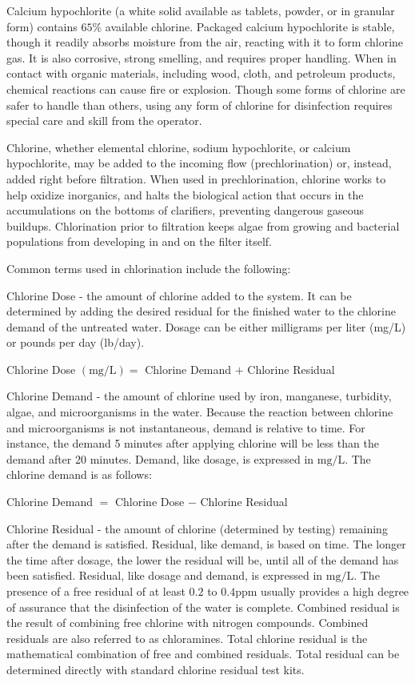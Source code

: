\documentclass[10pt]{article}
\begin{document}
Calcium hypochlorite (a white solid available as tablets, powder, or in granular form) contains $65 \%$ available chlorine. Packaged calcium hypochlorite is stable, though it readily absorbs moisture from the air, reacting with it to form chlorine gas. It is also corrosive, strong smelling, and requires proper handling. When in contact with organic materials, including wood, cloth, and petroleum products, chemical reactions can cause fire or explosion. Though some forms of chlorine are safer to handle than others, using any form of chlorine for disinfection requires special care and skill from the operator.

Chlorine, whether elemental chlorine, sodium hypochlorite, or calcium hypochlorite, may be added to the incoming flow (prechlorination) or, instead, added right before filtration. When used in prechlorination, chlorine works to help oxidize inorganics, and halts the biological action that occurs in the accumulations on the bottoms of clarifiers, preventing dangerous gaseous buildups. Chlorination prior to filtration keeps algae from growing and bacterial populations from developing in and on the filter itself.

Common terms used in chlorination include the following:

Chlorine Dose - the amount of chlorine added to the system. It can be determined by adding the desired residual for the finished water to the chlorine demand of the untreated water. Dosage can be either milligrams per liter (mg/L) or pounds per day (lb/day).

Chlorine Dose $(\mathrm{mg} / \mathrm{L})=$ Chlorine Demand $+$ Chlorine Residual

Chlorine Demand - the amount of chlorine used by iron, manganese, turbidity, algae, and microorganisms in the water. Because the reaction between chlorine and microorganisms is not instantaneous, demand is relative to time. For instance, the demand 5 minutes after applying chlorine will be less than the demand after 20 minutes. Demand, like dosage, is expressed in $\mathrm{mg} / \mathrm{L}$. The chlorine demand is as follows:

Chlorine Demand $=$ Chlorine Dose $-$ Chlorine Residual

Chlorine Residual - the amount of chlorine (determined by testing) remaining after the demand is satisfied. Residual, like demand, is based on time. The longer the time after dosage, the lower the residual will be, until all of the demand has been satisfied. Residual, like dosage and demand, is expressed in $\mathrm{mg} / \mathrm{L}$. The presence of a free residual of at least $0.2$ to $0.4 \mathrm{ppm}$ usually provides a high degree of assurance that the disinfection of the water is complete. Combined residual is the result of combining free chlorine with nitrogen compounds. Combined residuals are also referred to as chloramines. Total chlorine residual is the mathematical combination of free and combined residuals. Total residual can be determined directly with standard chlorine residual test kits.
\end{document}
